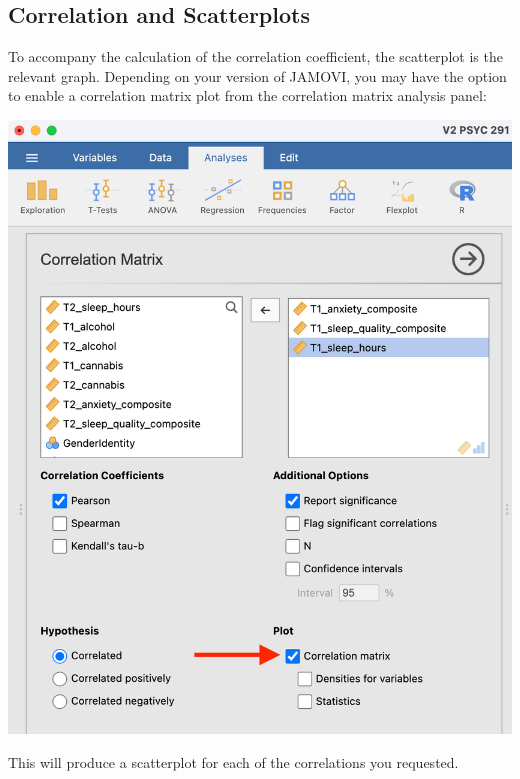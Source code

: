 \documentclass[
]{book}
\begin{document}
\hypertarget{correlation-and-scatterplots-1}{%
\subsection{Correlation and Scatterplots}\label{correlation-and-scatterplots-1}}

To accompany the calculation of the correlation coefficient, the scatterplot is the relevant graph. Depending on your version of JAMOVI, you may have the option to enable a correlation matrix plot from the correlation matrix analysis panel:

\includegraphics{img/corplot.png}

This will produce a scatterplot for each of the correlations you requested.
\end{document}
